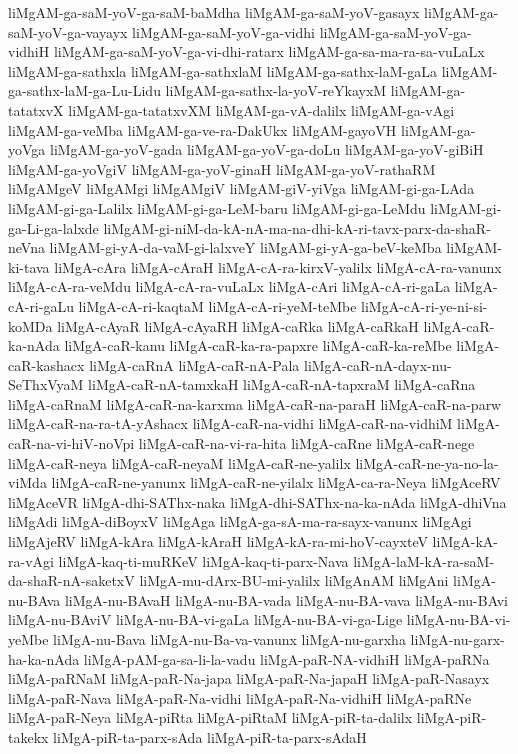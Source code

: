 {liMgAM-ga-saM-yoV-ga-saM-baMdha
liMgAM-ga-saM-yoV-gasayx
liMgAM-ga-saM-yoV-ga-vayayx
liMgAM-ga-saM-yoV-ga-vidhi
liMgAM-ga-saM-yoV-ga-vidhiH
liMgAM-ga-saM-yoV-ga-vi-dhi-ratarx
liMgAM-ga-sa-ma-ra-sa-vuLaLx
liMgAM-ga-sathxla
liMgAM-ga-sathxlaM
liMgAM-ga-sathx-laM-gaLa
liMgAM-ga-sathx-laM-ga-Lu-Lidu
liMgAM-ga-sathx-la-yoV-reYkayxM
liMgAM-ga-tatatxvX
liMgAM-ga-tatatxvXM
liMgAM-ga-vA-dalilx
liMgAM-ga-vAgi
liMgAM-ga-veMba
liMgAM-ga-ve-ra-DakUkx
liMgAM-gayoVH
liMgAM-ga-yoVga
liMgAM-ga-yoV-gada
liMgAM-ga-yoV-ga-doLu
liMgAM-ga-yoV-giBiH
liMgAM-ga-yoVgiV
liMgAM-ga-yoV-ginaH
liMgAM-ga-yoV-rathaRM
liMgAMgeV
liMgAMgi
liMgAMgiV
liMgAM-giV-yiVga
liMgAM-gi-ga-LAda
liMgAM-gi-ga-Lalilx
liMgAM-gi-ga-LeM-baru
liMgAM-gi-ga-LeMdu
liMgAM-gi-ga-Li-ga-lalxde
liMgAM-gi-niM-da-kA-nA-ma-na-dhi-kA-ri-tavx-parx-da-shaR-neVna
liMgAM-gi-yA-da-vaM-gi-lalxveY
liMgAM-gi-yA-ga-beV-keMba
liMgAM-ki-tava
liMgA-cAra
liMgA-cAraH
liMgA-cA-ra-kirxV-yalilx
liMgA-cA-ra-vanunx
liMgA-cA-ra-veMdu
liMgA-cA-ra-vuLaLx
liMgA-cAri
liMgA-cA-ri-gaLa
liMgA-cA-ri-gaLu
liMgA-cA-ri-kaqtaM
liMgA-cA-ri-yeM-teMbe
liMgA-cA-ri-ye-ni-si-koMDa
liMgA-cAyaR
liMgA-cAyaRH
liMgA-caRka
liMgA-caRkaH
liMgA-caR-ka-nAda
liMgA-caR-kanu
liMgA-caR-ka-ra-papxre
liMgA-caR-ka-reMbe
liMgA-caR-kashacx
liMgA-caRnA
liMgA-caR-nA-Pala
liMgA-caR-nA-dayx-nu-SeThxVyaM
liMgA-caR-nA-tamxkaH
liMgA-caR-nA-tapxraM
liMgA-caRna
liMgA-caRnaM
liMgA-caR-na-karxma
liMgA-caR-na-paraH
liMgA-caR-na-parw
liMgA-caR-na-ra-tA-yAshacx
liMgA-caR-na-vidhi
liMgA-caR-na-vidhiM
liMgA-caR-na-vi-hiV-noVpi
liMgA-caR-na-vi-ra-hita
liMgA-caRne
liMgA-caR-nege
liMgA-caR-neya
liMgA-caR-neyaM
liMgA-caR-ne-yalilx
liMgA-caR-ne-ya-no-la-viMda
liMgA-caR-ne-yanunx
liMgA-caR-ne-yilalx
liMgA-ca-ra-Neya
liMgAceRV
liMgAceVR
liMgA-dhi-SAThx-naka
liMgA-dhi-SAThx-na-ka-nAda
liMgA-dhiVna
liMgAdi
liMgA-diBoyxV
liMgAga
liMgA-ga-sA-ma-ra-sayx-vanunx
liMgAgi
liMgAjeRV
liMgA-kAra
liMgA-kAraH
liMgA-kA-ra-mi-hoV-cayxteV
liMgA-kA-ra-vAgi
liMgA-kaq-ti-muRKeV
liMgA-kaq-ti-parx-Nava
liMgA-laM-kA-ra-saM-da-shaR-nA-saketxV
liMgA-mu-dArx-BU-mi-yalilx
liMgAnAM
liMgAni
liMgA-nu-BAva
liMgA-nu-BAvaH
liMgA-nu-BA-vada
liMgA-nu-BA-vava
liMgA-nu-BAvi
liMgA-nu-BAviV
liMgA-nu-BA-vi-gaLa
liMgA-nu-BA-vi-ga-Lige
liMgA-nu-BA-vi-yeMbe
liMgA-nu-Bava
liMgA-nu-Ba-va-vanunx
liMgA-nu-garxha
liMgA-nu-garx-ha-ka-nAda
liMgA-pAM-ga-sa-li-la-vadu
liMgA-paR-NA-vidhiH
liMgA-paRNa
liMgA-paRNaM
liMgA-paR-Na-japa
liMgA-paR-Na-japaH
liMgA-paR-Nasayx
liMgA-paR-Nava
liMgA-paR-Na-vidhi
liMgA-paR-Na-vidhiH
liMgA-paRNe
liMgA-paR-Neya
liMgA-piRta
liMgA-piRtaM
liMgA-piR-ta-dalilx
liMgA-piR-takekx
liMgA-piR-ta-parx-sAda
liMgA-piR-ta-parx-sAdaH
}
